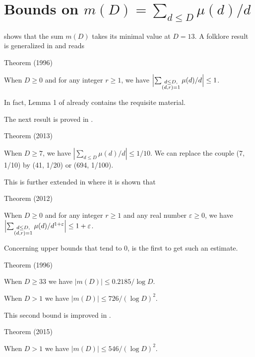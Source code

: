 \section{Bounds on $m(D)=\sum_{d\le D}\mu(d)/d$}


\cite{MacLeod*69} shows that the sum
$m(D)$ takes its minimal value at $D=13$.
A folklore result is generalized in 
\cite{Granville-Ramare*96} and reads
\begin{thm}{Theorem (1996)}

When $D\ge 0$ and for any integer $r\ge1$, we have $\Bigl|\sum_{\substack{d\le D,\\
(d,r)=1}}\mu(d)/d\Bigr|\le 1$.
\end{thm}

In fact, Lemma 1 of \cite{Davenport*37-1} already
contains the requisite material.

The next result is proved in
\cite{Ramare*12-5}.
\begin{thm}{Theorem (2013)}

When $D\ge 7$, we have $|\sum_{d\le D}\mu(d)/d|\le 1/10$. We can
replace the couple (7, 1/10) by (41, 1/20) or (694, 1/100).
\end{thm}


This is further extended in
\cite{Ramare*12-4} where it is shown
that
\begin{thm}{Theorem (2012)}

When $D\ge 0$ and for any integer $r\ge1$ and any real number $\varepsilon\ge0$, we have $\Bigl|\sum_{\substack{d\le D,\\
(d,r)=1}}\mu(d)/d^{1+\varepsilon}\Bigr|\le 1+\varepsilon$.
\end{thm}



Concerning upper bounds that tend to $0$, 
\cite{ElMarraki*96}
is the first to get such an estimate.
\begin{thm}{Theorem (1996)}

When $D\ge33$ we have $|m(D)|\le 0.2185/\log D$.

\par 
When $D > 1$ we have $|m(D)|\le 726/(\log D)^2$.
\end{thm}


This second bound is improved in
\cite{Bordelles*15}.
\begin{thm}{Theorem (2015)}

When $D > 1$ we have $|m(D)|\le 546/(\log D)^2$.
\end{thm}



